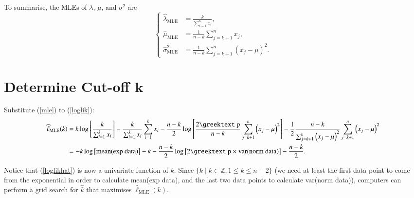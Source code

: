 \documentclass[a4paper,11pt,svgnames,dvipsnames]{article}
\renewcommand{\pi}{\text{\textrm{\greektext p}}}
\newcommand{\e}{\mathrm{e}}
\newcommand{\mle}[1]{\widehat{#1}_\text{MLE}}
\renewcommand{\hat}{\widehat}
\begin{document}
To summarise, the MLEs of $\lambda$, $\mu$, and $\sigma^2$ are
\begin{equation}\label{mle}
    \left\{
    \begin{aligned}
        \mle{\lambda}  & = \frac{k}{\sum_{i=1}^k x_i},                            \\
        \mle{\mu}      & = \frac{1}{n-k}\sum_{j=k+1}^n x_j,                       \\
        \mle{\sigma}^2 & = \frac{1}{n-k} \sum_{j=k+1}^n \left( x_j-\mu \right)^2.
    \end{aligned}
    \right.
\end{equation}

\section{Determine Cut-off $\boldsymbol{k}$}

Substitute (\ref{mle}) to (\ref{loglik}):
\begin{equation}\label{loglikhat}
    \begin{aligned}
        \mle{\ell}(k)
        & = k \log \left[ \frac{k}{\sum_{i=1}^k x_i} \right] - \frac{k}{\sum_{i=1}^k x_i} \sum_{i=1}^k x_i - \frac{n-k}{2} \log \left[ \frac{2\pi}{n-k} \sum_{j=k+1}^n \left( x_j - \mu \right)^2 \right] - \frac{1}{2} \frac{n-k}{\sum_{j=k+1}^n \left( x_j - \mu \right)^2} \sum_{j=k+1}^n \left( x_j - \mu \right)^2 \\
        & = -k \log \left[ \text{mean(exp data)} \right] - k - \frac{n-k}{2} \log \left[ 2\pi\times\text{var(norm data)} \right] - \frac{n-k}{2}.%
    \end{aligned}
\end{equation}

Notice that (\ref{loglikhat}) is now a univariate function of $k$. Since $\{ k \mid k \in \mathbb{Z}, 1 \leq k \leq n-2 \}$ (we need at least the first data point to come from the exponential in order to calculate mean(exp data), and the last two data points to calculate var(norm data)), computers can perform a grid search for $\hat{k}$ that maximises $\mle{\ell}(k)$.
\end{document}
